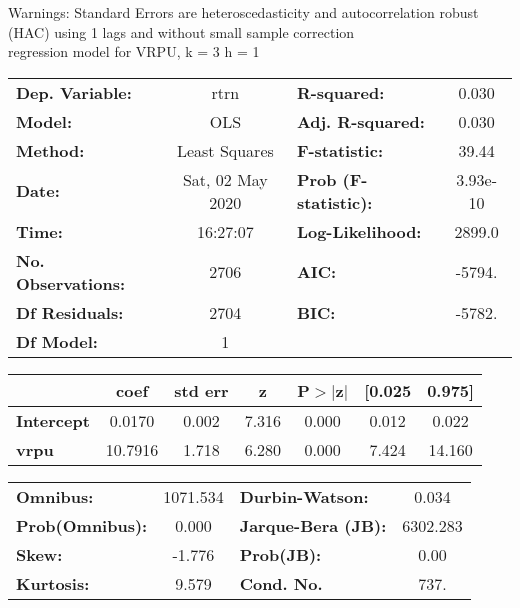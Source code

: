 Warnings: \newline
 [1] Standard Errors are heteroscedasticity and autocorrelation robust (HAC) using 1 lags and without small sample correction\\ 

regression model for VRPU, k = 3 h = 1\begin{center}
\begin{tabular}{lclc}
\toprule
\textbf{Dep. Variable:}    &       rtrn       & \textbf{  R-squared:         } &     0.030   \\
\textbf{Model:}            &       OLS        & \textbf{  Adj. R-squared:    } &     0.030   \\
\textbf{Method:}           &  Least Squares   & \textbf{  F-statistic:       } &     39.44   \\
\textbf{Date:}             & Sat, 02 May 2020 & \textbf{  Prob (F-statistic):} &  3.93e-10   \\
\textbf{Time:}             &     16:27:07     & \textbf{  Log-Likelihood:    } &    2899.0   \\
\textbf{No. Observations:} &        2706      & \textbf{  AIC:               } &    -5794.   \\
\textbf{Df Residuals:}     &        2704      & \textbf{  BIC:               } &    -5782.   \\
\textbf{Df Model:}         &           1      & \textbf{                     } &             \\
\bottomrule
\end{tabular}
\begin{tabular}{lcccccc}
                   & \textbf{coef} & \textbf{std err} & \textbf{z} & \textbf{P$> |$z$|$} & \textbf{[0.025} & \textbf{0.975]}  \\
\midrule
\textbf{Intercept} &       0.0170  &        0.002     &     7.316  &         0.000        &        0.012    &        0.022     \\
\textbf{vrpu}      &      10.7916  &        1.718     &     6.280  &         0.000        &        7.424    &       14.160     \\
\bottomrule
\end{tabular}
\begin{tabular}{lclc}
\textbf{Omnibus:}       & 1071.534 & \textbf{  Durbin-Watson:     } &    0.034  \\
\textbf{Prob(Omnibus):} &   0.000  & \textbf{  Jarque-Bera (JB):  } & 6302.283  \\
\textbf{Skew:}          &  -1.776  & \textbf{  Prob(JB):          } &     0.00  \\
\textbf{Kurtosis:}      &   9.579  & \textbf{  Cond. No.          } &     737.  \\
\bottomrule
\end{tabular}
\end{center}

